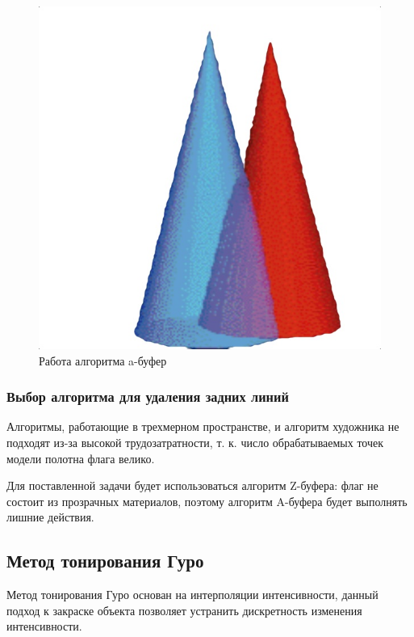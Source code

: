 \begin{figure}[ht!]
	\centering
	\includegraphics[scale=0.4]{abuffer}
	\caption{Работа алгоритма a-буфер}
	\label{fig:abuffer}
\end{figure}	

\subsubsection{Выбор алгоритма для удаления задних линий}
\hspace{0.6cm}Алгоритмы, работающие в трехмерном пространстве, и алгоритм художника не подходят из-за высокой трудозатратности, т. к. число обрабатываемых точек модели полотна флага велико.

\vspace{0.3cm}Для поставленной задачи будет использоваться алгоритм Z-буфера: флаг не состоит из прозрачных материалов, поэтому алгоритм A-буфера будет выполнять лишние действия.

\subsection{Метод тонирования Гуро}
\hspace{0.6cm}Метод тонирования Гуро основан на интерполяции интенсивности, данный подход к закраске объекта позволяет устранить дискретность изменения интенсивности.

